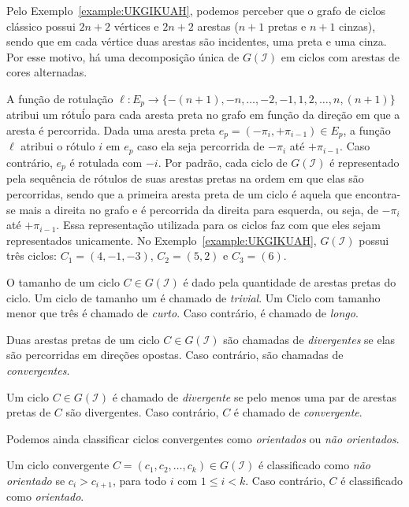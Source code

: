 

Pelo Exemplo~\ref{example:UKGIKUAH}, podemos perceber que o grafo de ciclos clássico possui $2n+2$ vértices e $2n+2$ arestas ($n+1$ pretas e $n+1$ cinzas), sendo que em cada vértice duas arestas são incidentes, uma preta e uma cinza. Por esse motivo, há uma decomposição única de $G(\mathcal{I})$ em ciclos com arestas de cores alternadas. 

A função de rotulação $\ell : E_p \rightarrow \{-(n+1),-n,\dots,-2,-1,1,2,\dots,n,(n+1)\}$ atribui um rótuĺo para cada aresta preta no grafo em função da direção em que a aresta é percorrida. Dada uma aresta preta $e_p = (-\pi_i, +\pi_{i-1}) \in E_p$, a função $\ell$ atribui o rótulo $i$ em $e_p$ caso ela seja percorrida de $-\pi_i$ até $+\pi_{i-1}$. Caso contrário, $e_p$ é rotulada com $-i$. Por padrão, cada ciclo de $G(\mathcal{I})$ é representado pela sequência de rótulos de suas arestas pretas na ordem em que elas são percorridas, sendo que a primeira aresta preta de um ciclo é aquela que encontra-se mais a direita no grafo e é percorrida da direita para esquerda, ou seja, de $-\pi_i$ até $+\pi_{i-1}$. Essa representação utilizada para os ciclos faz com que eles sejam representados unicamente. No Exemplo~\ref{example:UKGIKUAH}, $G(\mathcal{I})$ possui três ciclos: $C_1=(4,-1,-3)$, $C_2 = (5,2)$ e $C_3 = (6)$.

O tamanho de um ciclo $C\in G(\mathcal{I})$ é dado pela quantidade de arestas pretas do ciclo. Um ciclo de tamanho um é chamado de \emph{trivial}. Um Ciclo com tamanho menor que três é chamado de \emph{curto}. Caso contrário, é chamado de \emph{longo}. 

\begin{definition}
Duas arestas pretas de um ciclo $C\in G(\mathcal{I})$ são chamadas de \emph{divergentes} se elas são percorridas em direções opostas. Caso contrário, são chamadas de \emph{convergentes}.
\end{definition}
\begin{definition}
Um ciclo $C\in G(\mathcal{I})$ é chamado de \emph{divergente} se pelo menos uma par de arestas pretas de $C$ são divergentes. Caso contrário, $C$ é chamado de \emph{convergente}.
\end{definition}

Podemos ainda classificar ciclos convergentes como \emph{orientados} ou \emph{não orientados}. 

\begin{definition}
Um ciclo convergente $C = (c_1,c_2,\dots,c_k) \in G(\mathcal{I})$ é classificado como \emph{não orientado} se $c_i > c_{i+1}$, para todo $i$ com $1 \le i < k$. Caso contrário, $C$ é classificado como \emph{orientado}.
\end{definition}

